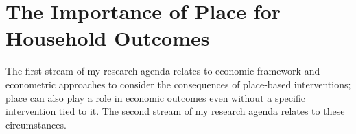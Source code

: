 


\section{The Importance of Place for Household Outcomes}


The first stream of my research agenda relates to economic framework and econometric approaches to consider the consequences of place-based interventions; place can also play a role in economic outcomes even without a specific intervention tied to it. The second stream of my research agenda relates to these circumstances.


